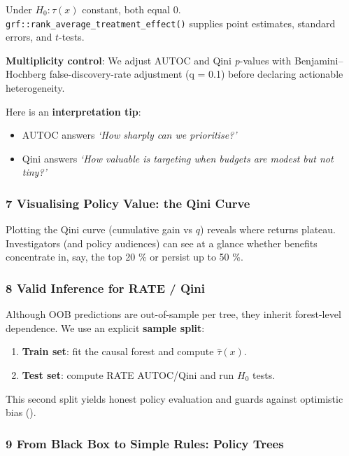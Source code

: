 \documentclass[
  single column]{article}
\providecommand{\tightlist}{%
  \setlength{\itemsep}{0pt}\setlength{\parskip}{0pt}}
\begin{document}
Under \(H_0{:}\tau(x)\) constant, both equal 0.
\texttt{grf::rank\_average\_treatment\_effect()} supplies point
estimates, standard errors, and \(t\)-tests.

\textbf{Multiplicity control}: We adjust AUTOC and Qini \emph{p}-values
with Benjamini--Hochberg false-discovery-rate adjustment (q = 0.1)
before declaring actionable heterogeneity.

Here is an \textbf{interpretation tip}:

\begin{itemize}
\tightlist
\item
  AUTOC answers \emph{`How sharply can we prioritise?'}
\item
  Qini answers \emph{`How valuable is targeting when budgets are modest
  but not tiny?'}
\end{itemize}

\subsubsection{7 Visualising Policy Value: the Qini
Curve}\label{visualising-policy-value-the-qini-curve}

Plotting the Qini curve (cumulative gain vs \(q\)) reveals where returns
plateau. Investigators (and policy audiences) can see at a glance
whether benefits concentrate in, say, the top 20 \% or persist up to 50
\%.

\subsubsection{8 Valid Inference for RATE /
Qini}\label{valid-inference-for-rate-qini}

Although OOB predictions are out-of-sample per tree, they inherit
forest-level dependence. We use an explicit \textbf{sample split}:

\begin{enumerate}
\def\labelenumi{\arabic{enumi}.}
\tightlist
\item
  \textbf{Train set}: fit the causal forest and compute
  \(\widehat{\tau}(x)\).
\item
  \textbf{Test set}: compute RATE AUTOC/Qini and run \(H_0\) tests.
\end{enumerate}

This second split yields honest policy evaluation and guards against
optimistic bias ().

\subsubsection{9 From Black Box to Simple Rules: Policy
Trees}\label{from-black-box-to-simple-rules-policy-trees}
\end{document}
